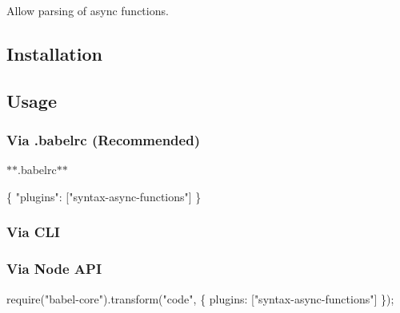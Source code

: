 Allow parsing of async functions.

\subsection*{Installation}




\subsection*{Usage}

\subsubsection*{Via {\ttfamily .babelrc} (Recommended)}

$\ast$$\ast$.babelrc$\ast$$\ast$


\begin{DoxyCode}
\{
  "plugins": ["syntax-async-functions"]
\}
\end{DoxyCode}


\subsubsection*{Via C\+LI}




\subsubsection*{Via Node A\+PI}


\begin{DoxyCode}
require("babel-core").transform("code", \{
  plugins: ["syntax-async-functions"]
\});
\end{DoxyCode}
 